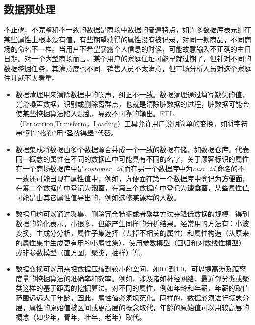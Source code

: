 \subsection{数据预处理}
\par 不正确，不完整和不一致的数据是商场中数据的普遍特点，如许多数据库表元组在某些属性上根本没有值，有些期望获得的属性没有被记录，对同一款商品，不同商场的命名不一样。当用户不希望暴露个人信息的时候，可能故意输入不正确的生日日期。对一个大型商场而言，某个用户的家庭住址可能早就过期了，但针对不同的数据挖掘任务，其满意度也不同，销售人员不太满意，但市场分析人员对这个家庭住址就不太看重。
\begin{itemize}
\item 数据清理用来清除数据中的噪声，纠正不一致。数据清理通过填写缺失的值，光滑噪声数据，识别或删除离群点，也就是清除脏数据的过程，脏数据可能会使某些挖掘算法陷入混乱，导致不可靠的输出。ETL（Etractrion,Transform，Loading）工具允许用户说明简单的变换，如将字符串“列宁格勒”用“圣彼得堡”代替。
\item 数据集成将数据由多个数据源合并成一个一致的数据存储，如数据仓库。代表同一概念的属性在不同的数据库中可能具有不同的名字，关于顾客标识的属性在一个商场数据库中是\textsl{customer\_id},而在另一个数据库中为\textsl{cust\_id},命名的不一致还可能出现在属性值中，例如，方便面在第一个数据库中登记为\textbf{方便面}，在第二个数据库中登记为\textbf{泡面}，在第三个数据库中登记为\textbf{速食面}，某些属性值可能是由其它属性值导出的，例如选修某课程的人数。
\item 数据归约可以通过聚集，删除冗余特征或者聚类方法来降低数据的规模，得到数据的简化表示，小很多，但能产生同样的分析结果。经常用的方法有：小波变换，主成分分析，属性子集选择（去掉不相关的属性）和属性构造（从原来的属性集中生成更有用的小属性集），使用参数模型（回归和对数线性模型）或非参数模型（直方图，聚类，抽样）等。
\item 数据变换可以用来把数据压缩到较小的空间，如0.0到1.0，可以提高涉及距离度量的挖掘算法的准确率和效率。例如，涉及诸如神经网络，最近邻分类或聚类这样的基于距离的挖掘算法。对不同的属性，例如年龄和年薪，年薪的取值范围远远大于年龄，因此，属性值必须规范化。同样的，数据必须进行概念分层，属性的原始值被区间或更高层的概念取代，年龄的原始值可以用较高层的概念（如少年，青年，壮年，老年）取代。
\end{itemize}
